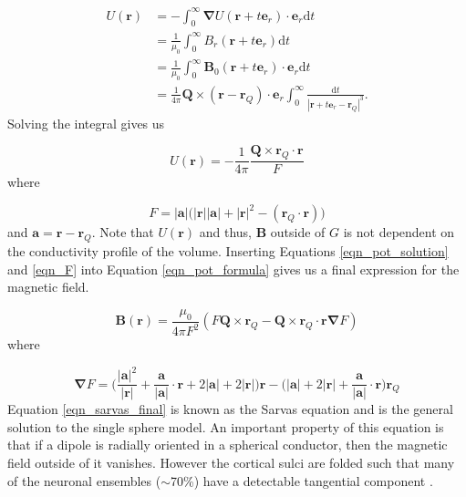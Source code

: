 \begin{equation}
	\begin{aligned}
		U(\mathbf{r}) &= - \int_0^\infty \mathbf{\nabla}U(\mathbf{r}+t\mathbf{e}_r)\cdot\mathbf{e}_r\text{d}t \\
		&= \frac{1}{\mu_0}\int_0^\infty B_r(\mathbf{r}+t\mathbf{e}_r)\text{d}t \\
		&= \frac{1}{\mu_0}\int_0^\infty \mathbf{B}_0(\mathbf{r}+t\mathbf{e}_r)\cdot\mathbf{e}_r\text{d}t \\
		&= \frac{1}{4\pi}\mathbf{Q}\times(\mathbf{r}-\mathbf{r}_Q)\cdot\mathbf{e}_r \int_0^\infty{\frac{\text{d}t}{|\mathbf{r}+t\mathbf{e}_r-\mathbf{r}_Q|^3}}.
	\end{aligned}
\end{equation} Solving the integral gives us

\begin{equation}
	U(\mathbf{r}) = -\frac{1}{4\pi}\frac{\mathbf{Q}\times\mathbf{r}_Q\cdot\mathbf{r}}{F} \label{eqn_pot_solution}
\end{equation} where 

\begin{equation}
F = |\mathbf{a}|\Big(|\mathbf{r}||\mathbf{a}|+|\mathbf{r}|^2-(\mathbf{r}_Q\cdot\mathbf{r})\Big) \label{eqn_F}
\end{equation} and $\mathbf{a}=\mathbf{r}-\mathbf{r}_Q$. Note that $U(\mathbf{r})$ and thus, \textbf{B} outside of $G$ is not dependent on the conductivity profile of the volume. Inserting Equations \ref{eqn_pot_solution} and \ref{eqn_F} into Equation \ref{eqn_pot_formula} gives us a final expression for the magnetic field.

\begin{equation}
\mathbf{B}(\mathbf{r})=\frac{\mu_0}{4\pi F^2}(F\mathbf{Q}\times\mathbf{r}_Q-\mathbf{Q}\times\mathbf{r}_Q\cdot\mathbf{r\nabla}F) \label{eqn_sarvas_final}
\end{equation} where

\begin{equation}
\mathbf{\nabla}F = \Bigg(\frac{|\mathbf{a}|^2}{|\mathbf{r}|}+\frac{\mathbf{a}}{|\mathbf{a}|}\cdot\mathbf{r}+2|\mathbf{a}|+2|\mathbf{r}|\Bigg)\mathbf{r}
-\Bigg(|\mathbf{a}|+2|\mathbf{r}|+\frac{\mathbf{a}}{|\mathbf{a}|}\cdot\mathbf{r}\Bigg)\mathbf{r}_Q
\end{equation} Equation \ref{eqn_sarvas_final} is known as the Sarvas equation and is the general solution to the single sphere model. An important property of this equation is that if a dipole is radially oriented in a spherical conductor, then the magnetic field outside of it vanishes. However the cortical sulci are folded such that many of the neuronal ensembles ($\sim$70\%) have a detectable tangential component \citep{Hillebrand2002}. 


